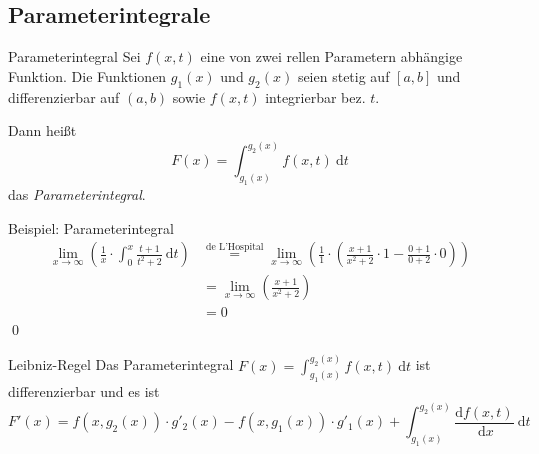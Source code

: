 \documentclass[german]{spicker}
\newcommand{\dx}{~\mathrm{d}x}
\newcommand{\dt}{~\mathrm{d}t}
\begin{document}
\subsection{Parameterintegrale}

\begin{defi}{Parameterintegral}
    Sei $f(x, t)$ eine von zwei rellen Parametern abhängige Funktion.
    Die Funktionen $g_1(x)$ und $g_2(x)$ seien stetig auf $[a, b]$ und differenzierbar auf $(a, b)$ sowie $f(x, t)$ integrierbar bez. $t$.

    Dann heißt
    $$
        F(x) = \int^{g_2(x)}_{g_1(x)} f(x, t) \dt
    $$
    das \emph{Parameterintegral}.
\end{defi}

\begin{bonus}{Beispiel: Parameterintegral}
    $$
        \begin{aligned}
            \lim_{x\to\infty} \left( \frac{1}{x} \cdot \int_0^x \frac{t+1}{t^2 + 2} \dt\right)
             & \overset{\text{de L'Hospital}}={} \lim_{x\to\infty} \left( \frac{1}{1} \cdot \left( \frac{x+1}{x^2 + 2} \cdot 1 - \frac{0+1}{0+2} \cdot 0 \right)\right) \\
             & ={} \lim_{x\to\infty} \left( \frac{x+1}{x^2 + 2} \right)                                                                                                 \\
             & ={} 0
        \end{aligned}
    $$\qed
\end{bonus}

\begin{defi}{Leibniz-Regel}
    Das Parameterintegral $F(x) = \int^{g_2(x)}_{g_1(x)} f(x, t) \dt$ ist differenzierbar und es ist
    $$
        F'(x) = f(x, g_2(x)) \cdot g'_2(x) - f(x, g_1(x)) \cdot g'_1(x) + \int^{g_2(x)}_{g_1(x)} \frac{\mathrm{d} f(x, t)}{\dx}\dt
    $$
\end{defi}
\end{document}

